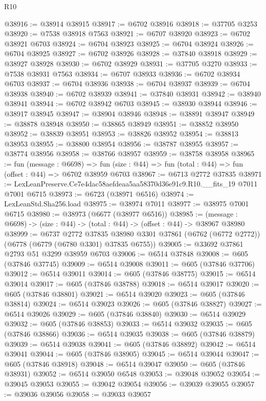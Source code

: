 \begin{lexlean}{R10}
\begin{coremodule}
@38916 := @38914 @38915
@38917 := @6702 @38916
@38918 := @37705 @3253
@38920 := @7538 @38918 @7563
@38921 := @6707 @38920
@38923 := @6702 @38921 @6703
@38924 := @6704 @38923
@38925 := @6704 @38924
@38926 := @6704 @38925
@38927 := @6702 @38926
@38928 := @37840 @38918
@38929 := @38927 @38928
@38930 := @6702 @38929
@38931 := @37705 @3270
@38933 := @7538 @38931 @7563
@38934 := @6707 @38933
@38936 := @6702 @38934 @6703
@38937 := @6704 @38936
@38938 := @6704 @38937
@38939 := @6704 @38938
@38940 := @6702 @38939
@38941 := @37840 @38931
@38942 := @38940 @38941
@38944 := @6702 @38942 @6703
@38945 := @38930 @38944
@38946 := @38917 @38945
@38947 := @38904 @38946
@38948 := @38891 @38947
@38949 := @38878 @38948
@38950 := @38865 @38949
@38951 := @38852 @38950
@38952 := @38839 @38951
@38953 := @38826 @38952
@38954 := @38813 @38953
@38955 := @38800 @38954
@38956 := @38787 @38955
@38957 := @38774 @38956
@38958 := @38766 @38957
@38959 := @38758 @38958
@38965 := fun (message : @6698) =>
  fun (size : @44) => fun (total : @44) => fun (offset : @44) => @6702 @38959 @6703
@38967 := @6713 @2772 @37835
@38971 := LexLeanPreserve.Ce7e4dac58aefdeaa5aa58370d36e91c9.R10.__fits_19 @7011 @7001 @6715
@38973 := @6723 (@38971 @6516)
@38974 := LexLeanStd.Sha256.load
@38975 := @38974 @7011
@38977 := @38975 @7001 @6715
@38980 := @38973 (@6677 (@38977 @6516))
@38985 := (message : @6698) -> (size : @44) -> (total : @44) -> (offset : @44) -> @38967 @38980
@38999 := @6737
    @2772
    @37835
    @38980
    @3301
    @37861
    (@6762 (@6772 @2772))
    (@6778 (@6779 (@6780 @3301) @37835 @6755))
@39005 := @33692 @37861 @2793 @51 @3299 @38959 @6703
@39006 := @6514 @37848
@39008 := @605 (@37846 @37745)
@39009 := @6514 @39008
@39011 := @605 (@37846 @37706)
@39012 := @6514 @39011
@39014 := @605 (@37846 @38775)
@39015 := @6514 @39014
@39017 := @605 (@37846 @38788)
@39018 := @6514 @39017
@39020 := @605 (@37846 @38801)
@39021 := @6514 @39020
@39023 := @605 (@37846 @38814)
@39024 := @6514 @39023
@39026 := @605 (@37846 @38827)
@39027 := @6514 @39026
@39029 := @605 (@37846 @38840)
@39030 := @6514 @39029
@39032 := @605 (@37846 @38853)
@39033 := @6514 @39032
@39035 := @605 (@37846 @38866)
@39036 := @6514 @39035
@39038 := @605 (@37846 @38879)
@39039 := @6514 @39038
@39041 := @605 (@37846 @38892)
@39042 := @6514 @39041
@39044 := @605 (@37846 @38905)
@39045 := @6514 @39044
@39047 := @605 (@37846 @38918)
@39048 := @6514 @39047
@39050 := @605 (@37846 @38931)
@39052 := @6514 @39050 @6548
@39053 := @39048 @39052
@39054 := @39045 @39053
@39055 := @39042 @39054
@39056 := @39039 @39055
@39057 := @39036 @39056
@39058 := @39033 @39057

\end{coremodule}
\end{lexlean}
